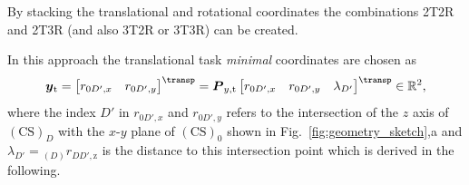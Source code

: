 \documentclass[graybox,vecphys]{svmult}
\newcommand{\ks}[1]{{(\mathrm{CS})_{#1}}}
\begin{document}
By stacking the translational and rotational coordinates the combinations 2T2R and 2T3R (and also 3T2R or 3T3R) can be created. 

In this approach the translational task \emph{minimal} coordinates are chosen as 
\begin{equation}
\label{eq:minimalkoordinaten_2T}
\vec{y}_{\mathrm{t}}
=
\begin{bmatrix}
r_{0D',x}  & r_{0D',y}
\end{bmatrix}^\transp
=
\vec{P}_{y,\mathrm{t}}
\begin{bmatrix}
r_{0D',x} & 
r_{0D',y} & 
{\lambda_{D'}}
\end{bmatrix}^\transp
\in {\mathbb{R}}^{2},
\end{equation}  
%
where the index $D'$ in $r_{0D',x}$ and $r_{0D',y}$ refers to the intersection of the $z$ axis of $\ks{D}$ with the $x$-$y$ plane of $\ks{0}$ shown in Fig.~\ref{fig:geometry_sketch},a and $\lambda_{D'} = {_{(D)}r_{DD',\mathrm{z}}}$ is the distance to this intersection point which is derived in the following. 
\end{document}
